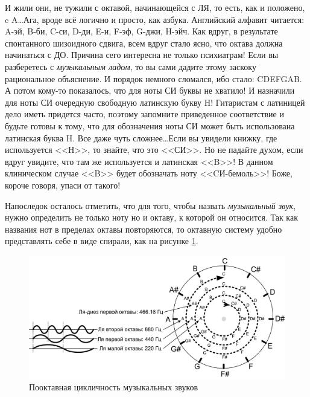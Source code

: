 \begin{Example}
    И жили они, не тужили с октавой, начинающейся с ЛЯ, то есть, как и положено, c A\ldots Ага, вроде всё логично и просто, как азбука. Английский алфавит читается: A-эй, B-би, C-си, D-ди, E-и, F-эф, G-джи, H-эйч. Как вдруг, в результате спонтанного шизоидного сдвига, всем вдруг стало ясно, что октава должна начинаться с ДО. Причина сего интересна не только психиатрам! Если вы разберетесь с \emph{музыкальным ладом}, то вы сами дадите этому заскоку рациональное объяснение. И порядок немного сломался, ибо стало: CDEFGAB. А потом кому-то показалось, что для ноты СИ буквы не хватило! И назначили для ноты СИ очередную свободную латинскую букву H! Гитаристам с латиницей дело иметь придется часто, поэтому запомните приведенное соответствие и будьте готовы к тому, что для обозначения ноты СИ может быть использована латинская буква H. Все даже чуть сложнее\ldots Если вы увидели книжку, где используется <<H>>, то знайте, что это <<СИ>>. Но не падайте духом, если вдруг увидите, что там же используется и латинская <<B>>! В данном клиническом случае <<B>> будет обозначать ноту <<CИ-бемоль>>! Боже, короче говоря, упаси от такого!
\end{Example}

Напоследок осталось отметить, что для того, чтобы назвать \emph{музыкальный звук}, нужно определить не только ноту но и октаву, к которой он относится. Так как названия нот в пределах октавы повторяются, то октавную систему удобно представлять себе в виде спирали, как на рисунке \ref{fig:notes:names:octave}.

\begin{figure}[!ht]
    \centering
    \includegraphics{fig/intervals/octave-spiral} 
    \caption{Пооктавная цикличность музыкальных звуков}\label{fig:notes:names:octave}
\end{figure} 

